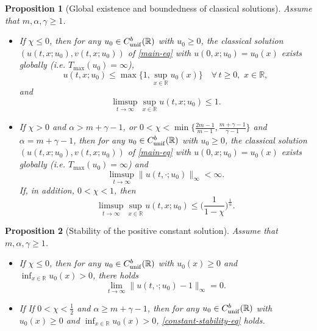 \documentclass[11pt]{article} %
\newtheorem{proposition}{Proposition}[section]
\theoremstyle{remark}
\theoremstyle{remark}
\numberwithin{equation}{section}
\numberwithin{figure}{section}
\numberwithin{table}{section}
\newcommand\RR{\ensuremath{\mathbb{R}}}
\begin{document}
\begin{proposition}[Global existence and boundedness of classical solutions]
\label{global-existence-prop}
Assume that $m,\alpha,\gamma\ge 1$.
\begin{itemize}
\item[(1)] If $\chi\le 0$, then for any $u_0\in C_{\rm unif}^b(\RR)$ with $u_0\ge 0$,
the classical solution $(u(t,x;u_0),v(t,x;u_0))$ of \eqref{main-eq} with $u(0,x;u_0)=u_0(x)$ exists globally
(i.e. $T_{\max}(u_0)=\infty$),
\begin{equation}
\label{upper-bound-eq1}
u(t,x;u_0)\le \max\{1,\sup_{x\in\RR}u_0(x)\}\quad \forall\, t\ge 0,\,\, x\in\RR,
\end{equation}
and
\begin{equation}
\label{upper-limit-eq1}
\limsup_{t\to\infty} \sup_{x\in\mathbb{R}}u(t,x;u_0)\le 1.
\end{equation}

\item[(2)]  If  $\chi> 0$ and $\alpha>m+\gamma-1$, or $0<\chi<\min\{ \frac{2m-1}{m-1}, \frac{m+\gamma -1}{\gamma-1}\}$ and $\alpha= m+\gamma -1$,  then  for any $u_0\in C_{\rm unif}^b(\RR)$ with $u_0\ge 0$,
the classical solution $(u(t,x;u_0),v(t,x;u_0))$ of \eqref{main-eq} with $u(0,x;u_0)=u_0(x)$ exists globally
(i.e. $T_{\max}(u_0)=\infty$) and
\begin{equation}
\label{upper-bound-eq2}
\limsup_{t\to\infty}\|u(t,\cdot;u_0)\|_\infty<\infty.
\end{equation}
If, in addition,  $0<\chi<1$, then 
\begin{equation}
\label{upper-limit-eq2}
\limsup_{t\to\infty} \sup_{x\in\mathbb{R}}u(t,x;u_0)\le \Big(\frac{1}{1-\chi}\Big)^{\frac{1}{\alpha}}.
\end{equation}
\end{itemize}
\end{proposition}


\begin{proposition}
[Stability of the positive constant solution]
\label{constant-stability-prop}
Assume that $m,\alpha,\gamma\ge 1$.
\begin{itemize}
\item[(1)] If $\chi\le  0$, then  for any $u_0\in C_{\rm unif}^b(\RR)$ with $u_0(x)\ge 0$
and  $\inf_{x\in\RR} u_0(x)>0$, there holds
\begin{equation}
\label{constant-stability-eq}
\lim_{t\to\infty} \|u(t,\cdot;u_0)-1\|_\infty =0.
\end{equation}

\item[(2]  If  
If  $0<\chi<\frac{1}{2}$  and  $\alpha\ge m+\gamma-1$, then for any $u_0\in C_{\rm unif}^b(\RR)$ with $u_0(x)\ge 0$ and   $\inf_{x\in\RR} u_0(x)>0$,  \eqref{constant-stability-eq} holds.
\end{itemize}
\end{proposition}
\end{document}
